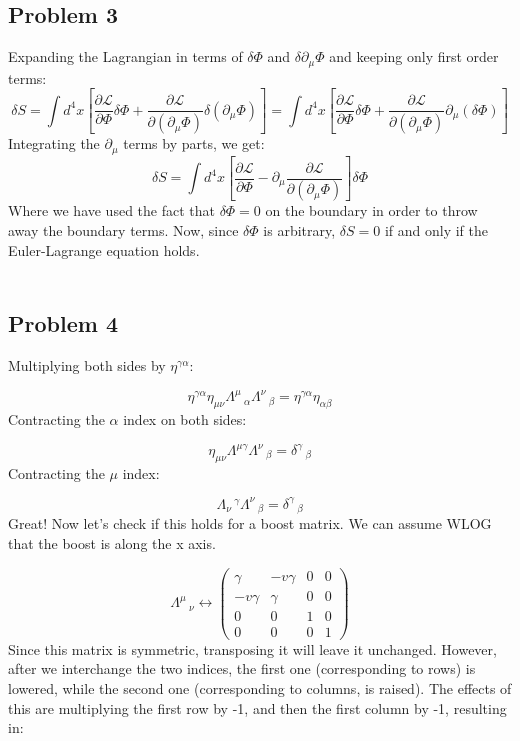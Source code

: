 \documentclass[12 pt]{article}
\begin{document}
\subsection*{Problem 3}
Expanding the Lagrangian in terms of $\delta \Phi$ and $\delta \partial_{\mu}\Phi$ and keeping only first order terms:
\[ \delta S = \int d^4 x \left[ \frac{\partial \mathcal{L}}{\partial \Phi} \delta \Phi + \frac{\partial \mathcal{L}}{\partial  (\partial_{\mu}\Phi)} \delta (\partial_{\mu}\Phi)  \right] = \int d^4 x \left[ \frac{\partial \mathcal{L}}{\partial \Phi} \delta \Phi + \frac{\partial \mathcal{L}}{\partial  (\partial_{\mu}\Phi)} \partial_{\mu}(\delta \Phi)  \right]  \]
Integrating the $\partial_{\mu}$ terms by parts, we get:
\[  \delta S = \int d^4 x \left[ \frac{\partial \mathcal{L}}{\partial \Phi} - \partial_{\mu} \frac{\partial \mathcal{L}}{\partial  (\partial_{\mu}\Phi)} \right] \delta \Phi   \]
Where we have used the fact that $\delta \Phi = 0$ on the boundary in order to throw away the boundary terms. Now, since $\delta \Phi $ is arbitrary, $\delta S = 0$ if and only if the Euler-Lagrange equation holds.
\\
\\

\subsection*{Problem 4}
Multiplying both sides by $\eta^{\gamma \alpha}$:

\[ \eta^{\gamma \alpha} \eta_{\mu \nu} \Lambda^{\mu}\, _{\alpha} \Lambda^{\nu}\, _{\beta} = \eta^{\gamma \alpha} \eta_{\alpha \beta}\]
Contracting the $\alpha$ index on both sides:

\[ \eta_{\mu \nu} \Lambda^{\mu \gamma} \Lambda^{\nu}\, _{\beta} = \delta^{\gamma}\, _{ \beta} \]
Contracting the $\mu$ index:

\[  \Lambda_{\nu}\, ^{ \gamma} \Lambda^{\nu}\, _{\beta} = \delta^{\gamma}\, _{ \beta}  \]
Great! Now let's check if this holds for a boost matrix. We can assume WLOG that the boost is along the x axis.

\[ \Lambda^{\mu}\, _{\nu} \leftrightarrow \left(  \begin{array}{cccc} 
	\gamma	& -v\gamma	& 0	& 0 \\
	-v\gamma	& \gamma		& 0	& 0 \\
	0		& 0			& 1	& 0 \\
	0		& 0			& 0	& 1 \end{array}    \right)  \]
Since this matrix is symmetric, transposing it will leave it unchanged. However, after we interchange the two indices, the first one (corresponding to rows) is lowered, while the second one (corresponding to columns, is raised). The effects of this are multiplying the first row by -1, and then the first column by -1, resulting in:
\end{document}
